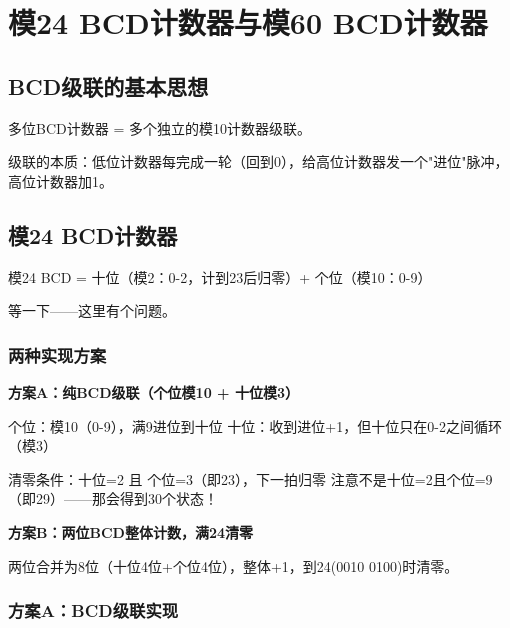 \chapter{模24 BCD计数器与模60 BCD计数器}

\section{BCD级联的基本思想}

多位BCD计数器 = 多个独立的模10计数器级联。

\begin{center}
\end{center}

级联的本质：低位计数器每完成一轮（回到0），给高位计数器发一个"进位"脉冲，高位计数器加1。

\section{模24 BCD计数器}

模24 BCD = 十位（模2：0-2，计到23后归零）+ 个位（模10：0-9）

等一下——这里有个问题。

\subsection{两种实现方案}

\textbf{方案A：纯BCD级联（个位模10 + 十位模3）}

个位：模10（0-9），满9进位到十位
十位：收到进位+1，但十位只在0-2之间循环（模3）

清零条件：十位=2 且 个位=3（即23），下一拍归零
注意不是十位=2且个位=9（即29）——那会得到30个状态！

\textbf{方案B：两位BCD整体计数，满24清零}

两位合并为8位（十位4位+个位4位），整体+1，到24(0010 0100)时清零。

\subsection{方案A：BCD级联实现}

